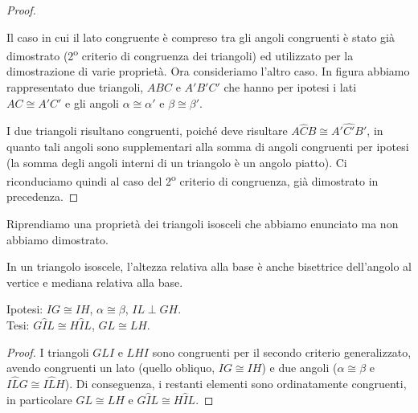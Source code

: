 \begin{proof}
~

\begin{minipage}{.49\textwidth}
  Il caso in cui il lato congruente è compreso tra gli angoli 
  congruenti è stato già dimostrato (2\textsuperscript{o} criterio di 
  congruenza dei triangoli) ed utilizzato per la dimostrazione di varie 
  proprietà. Ora consideriamo l'altro caso.
  In figura abbiamo rappresentato due triangoli, \(ABC\) e \(A'B'C'\) che 
  hanno per ipotesi i lati \(AC\cong A'C'\) e gli angoli \(\alpha\cong 
  \alpha'\) e \(\beta\cong \beta'\). 
\end{minipage}
\begin{minipage}{.49\textwidth}
 \begin{inaccessibleblock}
    \centering
\end{inaccessibleblock}
\end{minipage}
  I due triangoli risultano congruenti, 
  poiché deve risultare \(A\widehat{C}B\cong A'\widehat{C'}B'\), in 
  quanto tali angoli sono supplementari alla somma di angoli congruenti 
  per ipotesi (la somma degli angoli interni di un triangolo è un 
  angolo piatto). Ci riconduciamo quindi al caso del 
  2\textsuperscript{o} criterio di congruenza, già dimostrato in 
  precedenza.
\end{proof}

Riprendiamo una proprietà dei triangoli isosceli che abbiamo 
enunciato ma non abbiamo dimostrato.
\begin{proposizione}
  In un triangolo isoscele, l'altezza relativa alla base è anche 
  bisettrice dell'angolo al vertice e mediana relativa alla base.
\end{proposizione}

\noindent \begin{minipage}{0.6\textwidth}
  \noindent Ipotesi: \(IG\cong IH\), \(\alpha\cong \beta\), \(IL\perp GH\).\\
  Tesi: \(G\widehat{I}L\cong H\widehat{I}L\), \(GL\cong LH\).
  
  \begin{proof}
    I triangoli \(GLI\) e \(LHI\) sono congruenti per il secondo criterio 
    generalizzato, avendo congruenti un lato (quello obliquo, \(IG\cong 
    IH\)) e due angoli (\(\alpha\cong \beta\) e \(I\widehat{L}G \cong 
    I\widehat{L}H\)). Di conseguenza, i restanti elementi sono 
    ordinatamente congruenti, in particolare \(GL\cong LH\) e 
    \(G\widehat{I}L\cong H\widehat{I}L\).
  \end{proof}
\end{minipage}\hfil
\begin{minipage}{0.4\textwidth}
  \centering
\end{minipage}

